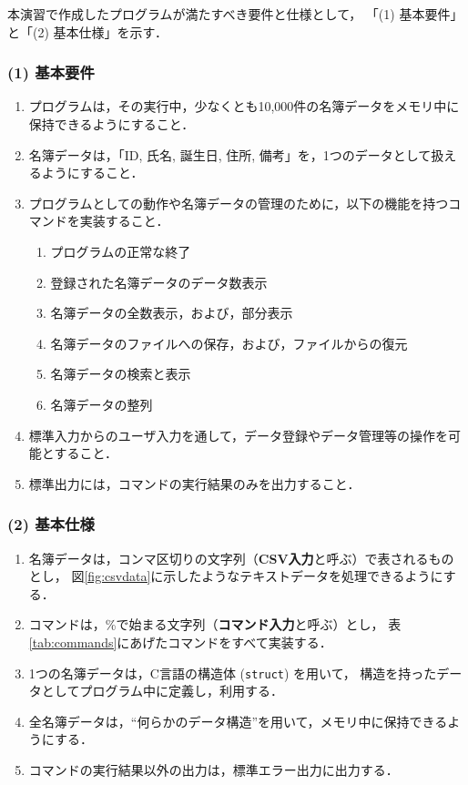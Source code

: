 \documentclass[autodetect-engine,dvi=dvipdfmx,ja=standard,
               a4j,11pt]{bxjsarticle}
\begin{document}
本演習で作成したプログラムが満たすべき要件と仕様として，
「(1) 基本要件」と「(2) 基本仕様」を示す．

\subsubsection*{(1) 基本要件}

\begin{enumerate}
  \setlength{\parskip}{0em} \setlength{\itemsep}{0.25em}
    \item プログラムは，その実行中，少なくとも10,000件の名簿データをメモリ中に保持できるようにすること．
    \item 名簿データは，「ID, 氏名, 誕生日, 住所, 備考」を，1つのデータとして扱えるようにすること．
    \item プログラムとしての動作や名簿データの管理のために，以下の機能を持つコマンドを実装すること．
    \begin{enumerate} \setlength{\parskip}{0em} \setlength{\itemsep}{0.25em}
        \item プログラムの正常な終了
        \item 登録された名簿データのデータ数表示
        \item 名簿データの全数表示，および，部分表示
        \item 名簿データのファイルへの保存，および，ファイルからの復元
        \item 名簿データの検索と表示
        \item 名簿データの整列
    \end{enumerate}
    \item 標準入力からのユーザ入力を通して，データ登録やデータ管理等の操作を可能とすること．
    \item 標準出力には，コマンドの実行結果のみを出力すること．
\end{enumerate}

\subsubsection*{(2) 基本仕様}

\begin{enumerate}
  \setlength{\parskip}{0em} \setlength{\itemsep}{0.25em}
    \item 名簿データは，コンマ区切りの文字列（\textbf{CSV入力}と呼ぶ）で表されるものとし，
          図\ref{fig:csvdata}に示したようなテキストデータを処理できるようにする．
    \item コマンドは，\%で始まる文字列（\textbf{コマンド入力}と呼ぶ）とし，
          表\ref{tab:commands}にあげたコマンドをすべて実装する．
    \item 1つの名簿データは，C言語の構造体 (\texttt{struct}) を用いて，
          構造を持ったデータとしてプログラム中に定義し，利用する．
    \item 全名簿データは，``何らかのデータ構造''を用いて，メモリ中に保持できるようにする．
    \item コマンドの実行結果以外の出力は，標準エラー出力に出力する．
\end{enumerate}
\end{document}
